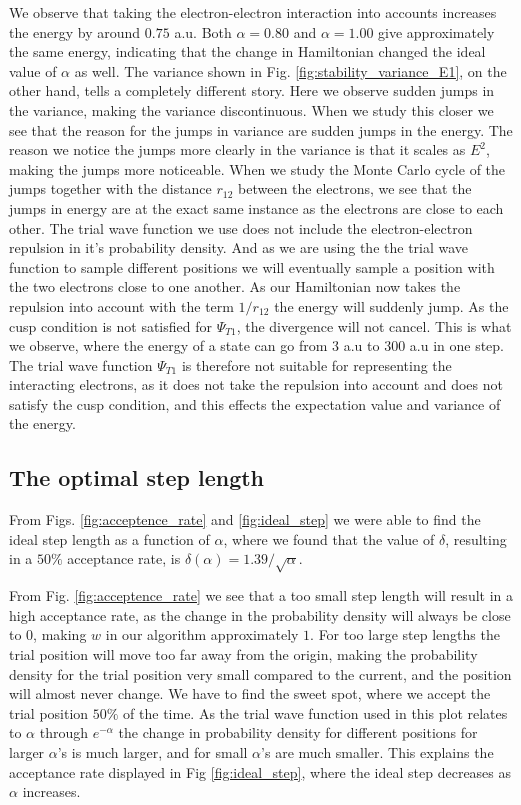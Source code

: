 \documentclass[%
 reprint,
nofootinbib,
aps,
]{revtex4-1}
\begin{document}
We observe that taking the electron-electron interaction into accounts increases the energy by around $0.75$ a.u. Both $\alpha=0.80$ and $\alpha=1.00$  give approximately the same energy, indicating that the change in Hamiltonian changed the ideal value of $\alpha$ as well. The variance shown in Fig. \vref{fig:stability_variance_E1}, on the other hand, tells a completely different story.
Here we observe sudden jumps in the variance, making the variance discontinuous. When we study this closer we see that the reason for the jumps in variance are sudden jumps in the energy. The reason we notice the jumps more clearly in the variance is that it scales as $E^2$, making the jumps more noticeable. When we study the Monte Carlo cycle of the jumps together with the distance $r_{12}$ between the electrons, we see that the jumps in energy are at the exact same instance as the electrons are close to each other. The trial wave function we use does not include the electron-electron repulsion in it's probability density. And as we are using the the trial wave function to sample different positions we will eventually sample a position with the two electrons close to one another. As our Hamiltonian now takes the repulsion into account with the term $1/r_{12}$ the energy will suddenly jump. As the cusp condition is not satisfied for $\Psi_{T1}$, the divergence will not cancel. This is what we observe, where the energy of a state can go from $3$ a.u to $300$ a.u in one step. The trial wave function $\Psi_{T1}$ is therefore not suitable for representing the interacting electrons, as it does not take the repulsion into account and does not satisfy the cusp condition, and this effects the expectation value and variance of the energy.


\subsection{The optimal step length}
From Figs. \ref{fig:acceptence_rate} and \vref{fig:ideal_step} we were able to find the ideal step length as a function of $\alpha$, where we found that the value of $\delta$, resulting in a $50\%$ acceptance rate, is $\delta(\alpha)=1.39/\sqrt{\alpha}$.

From Fig. \ref{fig:acceptence_rate} we see that a too small step length will result in a high acceptance rate, as the change in the probability density will always be close to $0$, making $w$ in our algorithm approximately $1$. For too large step lengths the trial position will move too far away from the origin, making the probability density for the trial position very small compared to the current, and the position will almost never change. We have to find the sweet spot, where we accept the trial position $50\%$ of the time. As the trial wave function used in this plot relates to $\alpha$ through $e^{-\alpha}$ the change in probability density for different positions for larger $\alpha$'s is much larger, and for small $\alpha$'s are much smaller. This explains the acceptance rate displayed in Fig \ref{fig:ideal_step}, where the ideal step decreases as $\alpha$ increases.
\end{document}
